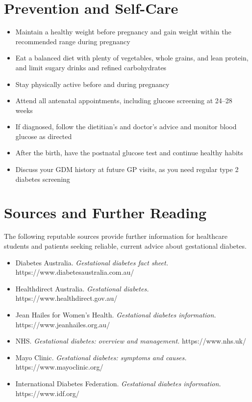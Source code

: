 \section*{Prevention and Self-Care}
\begin{itemize}
    \item Maintain a healthy weight before pregnancy and gain weight within the recommended range during pregnancy
    \item Eat a balanced diet with plenty of vegetables, whole grains, and lean protein, and limit sugary drinks and refined carbohydrates
    \item Stay physically active before and during pregnancy
    \item Attend all antenatal appointments, including glucose screening at 24--28 weeks
    \item If diagnosed, follow the dietitian's and doctor's advice and monitor blood glucose as directed
    \item After the birth, have the postnatal glucose test and continue healthy habits
    \item Discuss your GDM history at future GP visits, as you need regular type 2 diabetes screening
\end{itemize}

\section*{Sources and Further Reading}
The following reputable sources provide further information for healthcare students and patients seeking reliable, current advice about gestational diabetes.

\begin{itemize}
    \item Diabetes Australia. \textit{Gestational diabetes fact sheet.} https://www.diabetesaustralia.com.au/
    \item Healthdirect Australia. \textit{Gestational diabetes.} https://www.healthdirect.gov.au/
    \item Jean Hailes for Women's Health. \textit{Gestational diabetes information.} https://www.jeanhailes.org.au/
    \item NHS. \textit{Gestational diabetes: overview and management.} https://www.nhs.uk/
    \item Mayo Clinic. \textit{Gestational diabetes: symptoms and causes.} https://www.mayoclinic.org/
    \item International Diabetes Federation. \textit{Gestational diabetes information.} https://www.idf.org/
\end{itemize}
